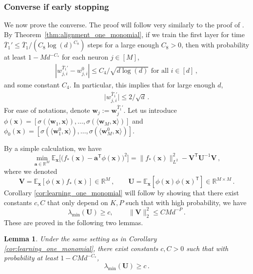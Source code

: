 \documentclass[11pt]{article}
\newcommand{\E}{\mathbb{E}}
\newcommand{\R}{\mathbb{R}}
\newcommand{\<}{\langle}
\renewcommand{\>}{\rangle}
\def\sT{{\mathsf T}}
\newtheorem{lemma}{Lemma}
\theoremstyle{definition}
\def\bU{{\boldsymbol U}}
\def\bV{{\boldsymbol V}}
\def\ba{{\boldsymbol a}}
\def\bw{{\boldsymbol w}}
\def\bx{{\boldsymbol x}}
\def\bw{{\boldsymbol w}}
\def\bx{{\boldsymbol x}}
\def\ba{{\boldsymbol a}}
\def\bU{{\boldsymbol U}}
\def\bV{{\boldsymbol V}}
\def\oT{\overline{T}}
\def\bU{{\boldsymbol U}}
\begin{document}
\subsubsection{Converse if early stopping}
\label{sec:cor_1_part_b_parity}

We now prove the converse. The proof will follow very similarly to the proof of \cite[Theorem 1]{ghorbani2021linearized}. By Theorem~\ref{thm:alignment_one_monomial}, if we train the first layer for time $\oT_1' \leq \oT_1 / (C_8 \log(d)^{C_8})$ steps for a large enough $C_8 > 0$, then with probability at least $1 - Md^{-C_*}$ for each neuron $j \in [M]$,
\begin{align}\label{eq:event_earlystop_small}
| w_{j,i}^{\oT_1'} - w_{j,i}^0| \leq C_4 /\sqrt{d \log (d)}\mbox{ for all }i \in [d]\,,
\end{align}
and some constant $C_4$. In particular, this implies that for large enough $d$, 
\begin{align*}
\Big\vert w_{j,i}^{\oT_1'} \Big\vert \leq 2 / \sqrt{d}\,.
\end{align*}
For ease of notations, denote $\bw_j := \bw_j^{\oT_1'}$. 
Let us introduce $\phi (\bx) = [ \sigma ( \< \bw_1 , \bx\>), \ldots ,  \sigma ( \< \bw_M , \bx\>)]$ and $\phi_0 (\bx) = [ \sigma ( \< \bw_1^0 , \bx\>), \ldots ,  \sigma ( \< \bw_M^0 , \bx\>)]$.

By a simple calculation, we have
\[
\min_{\ba \in \R^M} \E_{\bx} \Big[ \big( f_* (\bx) - \ba^\sT \phi (\bx) \big)^2 \Big] = \| f_* (\bx) \|_{L^2}^2 - \bV^\sT \bU^{-1} \bV \, ,
\]
where we denoted
\[
\bV = \E_{\bx} [ \phi (\bx) f_* (\bx)] \in \R^M\, , \qquad \bU = \E_{\bx} [ \phi (\bx) \phi (\bx)^\sT] \in  \R^{ M \times M}\, .
\]
Corollary \ref{cor:learning_one_monomial} will follow by showing that there exist constants $c,C$ that only depend on $K,P$ such that with high probability, we have 
\[
\lambda_{\min} ( \bU ) \geq c,\, \qquad \| \bV \|_2^2 \leq C M d^{-P}\, .
\]
These are proved in the following two lemmas.

\begin{lemma}\label{lem:lower_bound_U}
    Under the same setting as in Corollary \ref{cor:learning_one_monomial}, there exist  constants $c,C>0$ such that with probability at least $1 - CMd^{-C_*}$,
    \[
    \lambda_{\min} ( \bU ) \geq c \, .
    \]
\end{lemma}
\end{document}
